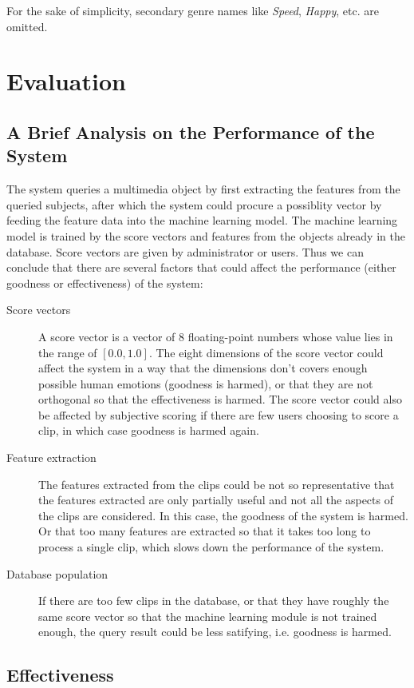 \documentclass{report}
\begin{document}
For the sake of simplicity, secondary genre names like \textit{Speed}, \textit{Happy}, etc. are omitted.

\section{Evaluation}

\subsection{A Brief Analysis on the Performance of the System}

The system queries a multimedia object by first extracting the features from the queried subjects, after which the system could procure a possiblity vector by feeding the feature data into the machine learning model. The machine learning model is trained by the score vectors and features from the objects already in the database. Score vectors are given by administrator or users. Thus we can conclude that there are several factors that could affect the performance (either goodness or effectiveness) of the system:
\begin{description}
\item[Score vectors] A score vector is a vector of 8 floating-point numbers whose value lies in the range of $[0.0, 1.0]$. The eight dimensions of the score vector could affect the system in a way that the dimensions don't covers enough possible human emotions (goodness is harmed), or that they are not orthogonal so that the effectiveness is harmed. The score vector could also be affected by subjective scoring if there are few users choosing to score a clip, in which case goodness is harmed again.
\item[Feature extraction] The features extracted from the clips could be not so representative that the features extracted are only partially useful and not all the aspects of the clips are considered. In this case, the goodness of the system is harmed. Or that too many features are extracted so that it takes too long to process a single clip, which slows down the performance of the system.
\item[Database population] If there are too few clips in the database, or that they have roughly the same score vector so that the machine learning module is not trained enough, the query result could be less satifying, i.e. goodness is harmed.
\end{description}

\subsection{Effectiveness}
\end{document}
